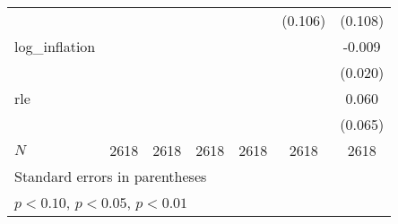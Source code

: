 {\begin{tabular}{l*{6}{c}}
            &                     &                     &                     &                     &     (0.106)         &     (0.108)         \\
\addlinespace
log\_inflation&                     &                     &                     &                     &                     &      -0.009         \\
            &                     &                     &                     &                     &                     &     (0.020)         \\
\addlinespace
rle         &                     &                     &                     &                     &                     &       0.060         \\
            &                     &                     &                     &                     &                     &     (0.065)         \\
\midrule
\(N\)       &        2618         &        2618         &        2618         &        2618         &        2618         &        2618         \\
\bottomrule
\multicolumn{7}{l}{\footnotesize Standard errors in parentheses}\\
\multicolumn{7}{l}{\footnotesize \sym{*} \(p<0.10\), \sym{**} \(p<0.05\), \sym{***} \(p<0.01\)}\\
\end{tabular}
}
